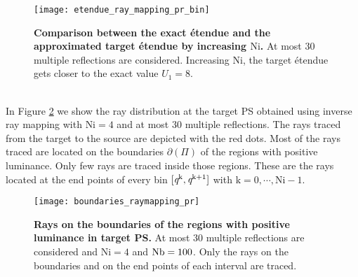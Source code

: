 \begin{figure}[t]
  \begin{center}
  \texttt{[image: etendue\_ray\_mapping\_pr\_bin]}
  \end{center}
  \caption{\textbf{Comparison between the exact \'{e}tendue and the approximated target \'{e}tendue by increasing $\textrm{Ni}$.}
 At most $30$ multiple reflections are considered. Increasing $\textrm{Ni}$, the target \'{e}tendue gets closer to the exact value $U_1=8$.}
\label{fig:etendue_ray_mapping_pr_bin}
 \end{figure}
\\ \indent In Figure \ref{fig:boundaries_rays_pr_raymapping} we show the ray distribution at the target PS obtained using inverse ray mapping with $\textrm{Ni}=4$ and at most $30$ multiple reflections. The rays traced from the target to the source are depicted with the red dots. Most of the rays traced are located on the boundaries $\partial$$(\Pi)$ of the regions with positive luminance. 
Only few rays are traced inside those regions. These are the rays located at the end points of every bin $[\textit{q}^{\textrm{k}}, \textit{q}^{\textrm{k}+1}]$ with $\textrm{k}=0, \cdots, \textrm{Ni}-1$. 
\begin{figure}[h]
  \begin{center}
  \texttt{[image: boundaries\_raymapping\_pr]}
  \end{center}
  \caption{\textbf{Rays on the boundaries of the regions with positive luminance in target PS.}
 At most $30$ multiple reflections are considered and $\textrm{Ni}=4$ and $\textrm{Nb} = 100$. Only the rays on the boundaries and on the end points of each interval are traced.}
\label{fig:boundaries_rays_pr_raymapping}
 \end{figure}
\\ \indent
